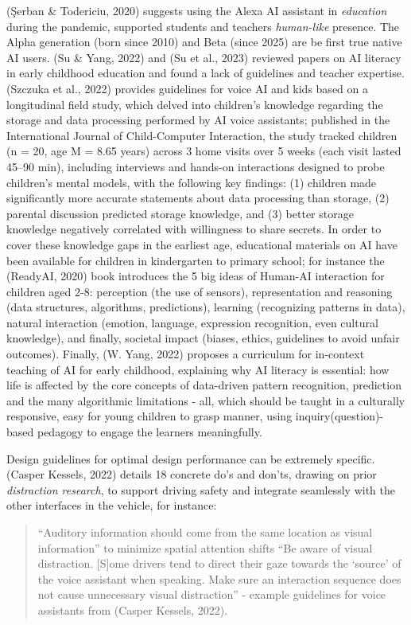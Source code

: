 \documentclass[
  12pt,
  letterpaper,
  DIV=11,
  numbers=noendperiod]{scrartcl}
\begin{document}
(Şerban \& Todericiu, 2020) suggests using the Alexa AI assistant in
\emph{education} during the pandemic, supported students and teachers
\emph{human-like} presence. The Alpha generation (born since 2010) and
Beta (since 2025) are be first true native AI users. (Su \& Yang, 2022)
and (Su et al., 2023) reviewed papers on AI literacy in early childhood
education and found a lack of guidelines and teacher expertise. (Szczuka
et al., 2022) provides guidelines for voice AI and kids based on a
longitudinal field study, which delved into children's knowledge
regarding the storage and data processing performed by AI voice
assistants; published in the International Journal of Child-Computer
Interaction, the study tracked children (n = 20, age M = 8.65 years)
across 3 home visits over 5 weeks (each visit lasted 45--90 min),
including interviews and hands-on interactions designed to probe
children's mental models, with the following key findings: (1) children
made significantly more accurate statements about data processing than
storage, (2) parental discussion predicted storage knowledge, and (3)
better storage knowledge negatively correlated with willingness to share
secrets. In order to cover these knowledge gaps in the earliest age,
educational materials on AI have been available for children in
kindergarten to primary school; for instance the (ReadyAI, 2020) book
introduces the 5 big ideas of Human-AI interaction for children aged
2-8: perception (the use of sensors), representation and reasoning (data
structures, algorithms, predictions), learning (recognizing patterns in
data), natural interaction (emotion, language, expression recognition,
even cultural knowledge), and finally, societal impact (biases, ethics,
guidelines to avoid unfair outcomes). Finally, (W. Yang, 2022) proposes
a curriculum for in-context teaching of AI for early childhood,
explaining why AI literacy is essential: how life is affected by the
core concepts of data-driven pattern recognition, prediction and the
many algorithmic limitations - all, which should be taught in a
culturally responsive, easy for young children to grasp manner, using
inquiry(question)-based pedagogy to engage the learners meaningfully.

Design guidelines for optimal design performance can be extremely
specific. (Casper Kessels, 2022) details 18 concrete do's and don'ts,
drawing on prior \emph{distraction research}, to support driving safety
and integrate seamlessly with the other interfaces in the vehicle, for
instance:

\begin{quote}
``Auditory information should come from the same location as visual
information'' to minimize spatial attention shifts ``Be aware of visual
distraction. {[}S{]}ome drivers tend to direct their gaze towards the
`source' of the voice assistant when speaking. Make sure an interaction
sequence does not cause unnecessary visual distraction'' - example
guidelines for voice assistants from (Casper Kessels, 2022).
\end{quote}
\end{document}
